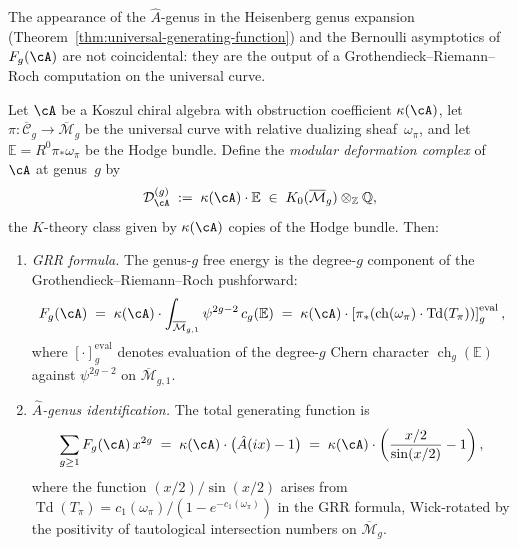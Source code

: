 The appearance of the $\hat{A}$-genus in the Heisenberg genus
expansion (Theorem~\ref{thm:universal-generating-function})
and the Bernoulli asymptotics of $F_g(\cA)$ are not coincidental:
they are the output of a Grothendieck--Riemann--Roch computation
on the universal curve.

\begin{theorem}\label{thm:family-index}
Let $\cA$ be a Koszul chiral algebra with obstruction coefficient
$\kappa(\cA)$, let $\pi \colon \overline{\mathcal{C}}_g \to
\overline{\mathcal{M}}_g$ be the universal curve with relative
dualizing sheaf~$\omega_\pi$, and let
$\mathbb{E} = R^0\pi_*\omega_\pi$ be the Hodge bundle.
Define the \emph{modular deformation complex} of~$\cA$ at genus~$g$ by
\begin{equation}\label{eq:modular-deformation-complex-concordance}
\mathcal{D}_{\cA}^{(g)}
\;:=\;
\kappa(\cA) \cdot \mathbb{E}
\;\in\; K_0(\overline{\mathcal{M}}_g) \otimes_{\mathbb{Z}} \mathbb{Q},
\end{equation}
the $K$-theory class given by $\kappa(\cA)$ copies of the
Hodge bundle.  Then:
\begin{enumerate}[label=\textup{(\roman*)}]
\item \emph{GRR formula.}
The genus-$g$ free energy is the degree-$g$ component of the
Grothendieck--Riemann--Roch pushforward:
\begin{equation}\label{eq:family-index-grr}
F_g(\cA)
\;=\;
\kappa(\cA) \cdot
\int_{\overline{\mathcal{M}}_{g,1}} \psi^{2g-2}\, c_g(\mathbb{E})
\;=\;
\kappa(\cA) \cdot
\left[
  \pi_*\!\left(
    \operatorname{ch}(\omega_\pi) \cdot
    \operatorname{Td}(T_\pi)
  \right)
\right]_g^{\mathrm{eval}},
\end{equation}
where $[\cdot]_g^{\mathrm{eval}}$ denotes evaluation of the degree-$g$ Chern character
$\operatorname{ch}_g(\mathbb{E})$ against $\psi^{2g-2}$ on
$\overline{\mathcal{M}}_{g,1}$.

\item \emph{$\hat{A}$-genus identification.}
The total generating function is
\begin{equation}\label{eq:family-index-generating}
\sum_{g \geq 1} F_g(\cA)\, x^{2g}
\;=\;
\kappa(\cA) \cdot \bigl(\hat{A}(ix) - 1\bigr)
\;=\;
\kappa(\cA) \cdot
\left(\frac{x/2}{\sin(x/2)} - 1\right),
\end{equation}
where the function $(x/2)/\sin(x/2)$ arises from
$\operatorname{Td}(T_\pi) = c_1(\omega_\pi)/(1 - e^{-c_1(\omega_\pi)})$
in the GRR formula, Wick-rotated by the positivity of
tautological intersection numbers on
$\overline{\mathcal{M}}_g$.


\end{enumerate}
\end{theorem}
